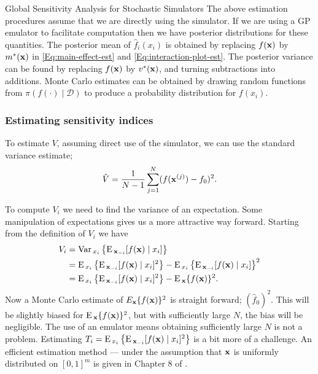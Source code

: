 \begin{chapter}{Global Sensitivity Analysis for Stochastic Simulators\label{Ch:sensitivity}}
The above estimation procedures assume that we are directly using the simulator. If we are using a GP emulator to facilitate computation then we have posterior distributions for these quantities. The posterior mean of $\hat{f}_i(x_i)$ is obtained by replacing $f(\mathbf{x})$ by $m^*(\mathbf{x})$ in \cref{Eq:main-effect-est} and \cref{Eq:interaction-plot-est}. The posterior variance can be found by replacing $f(\mathbf{x})$ by $v^{*}(\mathbf{x})$, and turning subtractions into additions. Monte Carlo estimates can be obtained by drawing random functions from $\pi(f(\cdot) \mid \mathcal{D})$  to produce a probability distribution for $f(x_i)$.

\subsubsection{Estimating sensitivity indices}

To estimate $V$, assuming direct use of the simulator, we can use the standard variance estimate;
\begin{equation}
 \hat{V} = \frac{1}{N-1} \sum_{j=1}^N (f(\mathbf{x}^{(j)}) - f_0)^2.
\end{equation}

To compute $V_i$ we need to find the variance of an expectation. Some manipulation of expectations gives us a more attractive way forward. Starting from the definition of $V_i$ we have
\begin{align}
V_i &= \mathrm{Var}\,_{x_i} \left\{  \textrm{E}\,_{\mathbf{x}_{-i}} [f(\mathbf{x})\mid x_i] \right\}\\
    &= \textrm{E}\,_{x_i}\left\{  \textrm{E}\,_{\mathbf{x}_{-i}} [f(\mathbf{x})\mid x_i]^2 \right\} - \textrm{E}\,_{x_i}\left\{  \textrm{E}\,_{\mathbf{x}_{-i}} [f(\mathbf{x})\mid x_i] \right\}^2\\
    &= \textrm{E}\,_{x_i}\left\{  \textrm{E}\,_{\mathbf{x}_{-i}} [f(\mathbf{x})\mid x_i]^2 \right\} - \textrm{E}\,_{\mathbf{x}} \{ f(\mathbf{x}) \}^2.
\end{align}
Now a Monte Carlo estimate of $E_{\mathbf{x}} \{ f(\mathbf{x}) \}^2$ is straight forward; $(\hat{f}_0)^2$. This will be slightly biased for $\textrm{E}\,_{\mathbf{x}}\{f(\mathbf{x})\}^2$, but with sufficiently large $N$, the bias will be negligible. The use of an emulator means obtaining sufficiently large $N$ is not a problem. Estimating $T_i  = \textrm{E}\,_{x_i}\left\{  \textrm{E}\,_{\mathbf{x}_{-i}} [f(\mathbf{x})\mid x_i]^2 \right\}$ is a bit more of a challenge. An efficient estimation method --- under the assumption that $\mathbf{x}$ is uniformly distributed on $[0, 1]^m$ is given in Chapter $8$ of \citet{Gramacy2020surrogates}. 


\end{chapter}
